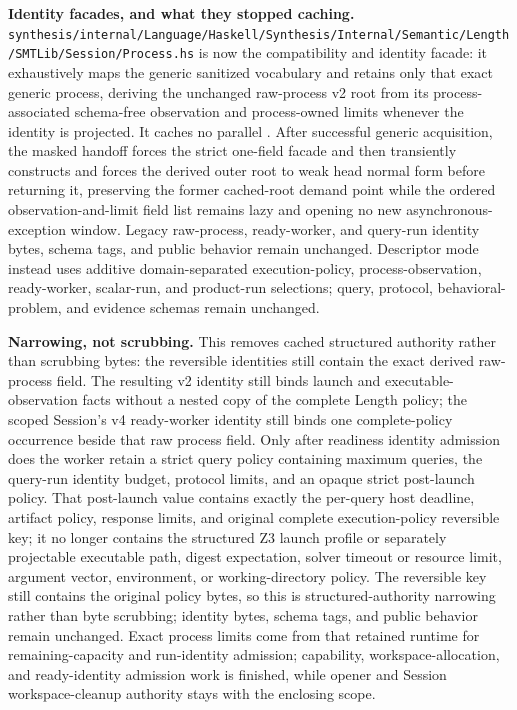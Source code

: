\documentclass[10pt,letterpaper,oneside]{report}
\newcommand{\code}[1]{\texttt{\detokenize{#1}}}
\newcommand{\filepath}[1]{\nolinkurl{#1}}
\begin{document}
\begin{enumerate}
  \textbf{Identity facades, and what they stopped caching.} \filepath{synthesis/internal/Language/Haskell/Synthesis/Internal/Semantic/Length/SMTLib/Session/Process.hs} is now the compatibility and identity facade: it exhaustively maps the generic sanitized vocabulary and retains only that exact generic process, deriving the unchanged raw-process v2 root from its process-associated schema-free observation and process-owned limits whenever the identity is projected. It caches no parallel \code{FingerprintField}. After successful generic acquisition, the masked handoff forces the strict one-field facade and then transiently constructs and forces the derived outer root to weak head normal form before returning it, preserving the former cached-root demand point while the ordered observation-and-limit field list remains lazy and opening no new asynchronous-exception window. Legacy raw-process, ready-worker, and query-run identity bytes, schema tags, and public behavior remain unchanged. Descriptor mode instead uses additive domain-separated execution-policy, process-observation, ready-worker, scalar-run, and product-run selections; query, protocol, behavioral-problem, and evidence schemas remain unchanged.

  \textbf{Narrowing, not scrubbing.} This removes cached structured authority rather than scrubbing bytes: the reversible identities still contain the exact derived raw-process field. The resulting v2 identity still binds launch and executable-observation facts without a nested copy of the complete Length policy; the scoped Session's v4 ready-worker identity still binds one complete-policy occurrence beside that raw process field. Only after readiness identity admission does the worker retain a strict query policy containing maximum queries, the query-run identity budget, protocol limits, and an opaque strict post-launch policy. That post-launch value contains exactly the per-query host deadline, artifact policy, response limits, and original complete execution-policy reversible key; it no longer contains the structured Z3 launch profile or separately projectable executable path, digest expectation, solver timeout or resource limit, argument vector, environment, or working-directory policy. The reversible key still contains the original policy bytes, so this is structured-authority narrowing rather than byte scrubbing; identity bytes, schema tags, and public behavior remain unchanged. Exact process limits come from that retained runtime for remaining-capacity and run-identity admission; capability, workspace-allocation, and ready-identity admission work is finished, while opener and Session workspace-cleanup authority stays with the enclosing scope.


\end{enumerate}
\end{document}
